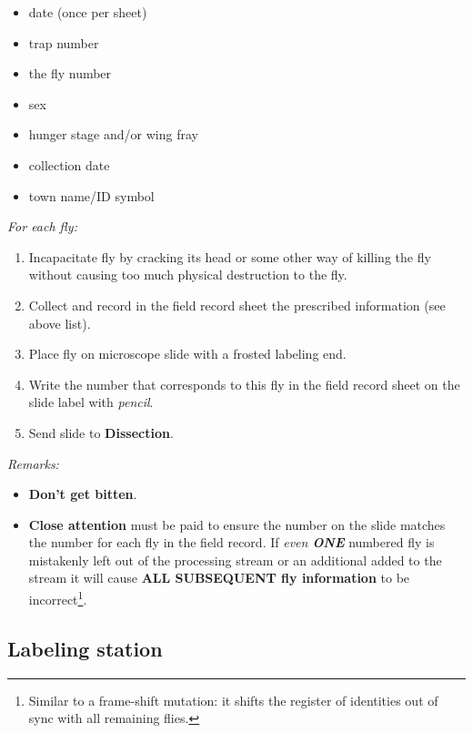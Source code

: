 \documentclass[letterpaper]{scrreprt}
\begin{document}
\begin{itemize}
\itemsep1pt\parskip0pt
\item
  date (once per sheet)
\item
  trap number
\item
  the fly number
\item
  sex
\item
  hunger stage and/or wing fray
\item
  collection date
\item
  town name/ID symbol
\end{itemize}

\emph{For each fly:}

\begin{enumerate}
\def\labelenumi{\arabic{enumi}.}
\itemsep1pt\parskip0pt
\item
  Incapacitate fly by cracking its head or some other way of killing the
  fly without causing too much physical destruction to the fly.
\item
  Collect and record in the field record sheet the prescribed
  information (see above list).
\item
  Place fly on microscope slide with a frosted labeling end.
\item
  Write the number that corresponds to this fly in the field record
  sheet on the slide label with \emph{pencil}.
\item
  Send slide to \textbf{Dissection}.
\end{enumerate}

\emph{Remarks:}

\begin{itemize}
\itemsep1pt\parskip0pt
\item
  \textbf{Don't get bitten}.
\item
  \textbf{Close attention} must be paid to ensure the number on the
  slide matches the number for each fly in the field record. If
  \emph{even \textbf{ONE}} numbered fly is mistakenly left out of the
  processing stream or an additional added to the stream it will cause
  \textbf{ALL SUBSEQUENT fly information} to be incorrect\footnote{Similar
    to a frame-shift mutation: it shifts the register of identities out
    of sync with all remaining flies.}.
\end{itemize}

\subsection{Labeling station}\label{labeling-station}
\end{document}
